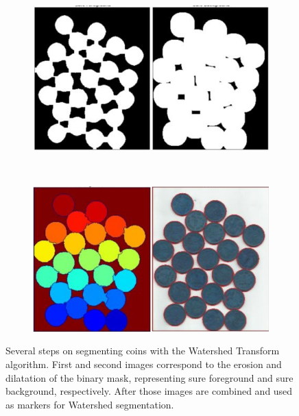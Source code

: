 
\begin{figure}[htbp]
	\centering
    \begin{subfigure}[l]{0.49\textwidth}
	    \centering
    	\includegraphics[width=\textwidth]
    	{figures/Watershed-example-02.png}
	\end{subfigure}
	~
    \begin{subfigure}[r]{0.49\textwidth}
	    \centering
    	\includegraphics[width=\textwidth]
    	{figures/Watershed-example-03.png}
	\end{subfigure} 
    \caption{Several steps on segmenting coins with the Watershed Transform algorithm. First and second images correspond to the erosion and dilatation of the binary mask, representing sure foreground and sure background, respectively. After those images are combined and used as markers for Watershed segmentation. \comment{[...]}}
    \label{fig:watershed_example}
\end{figure}


